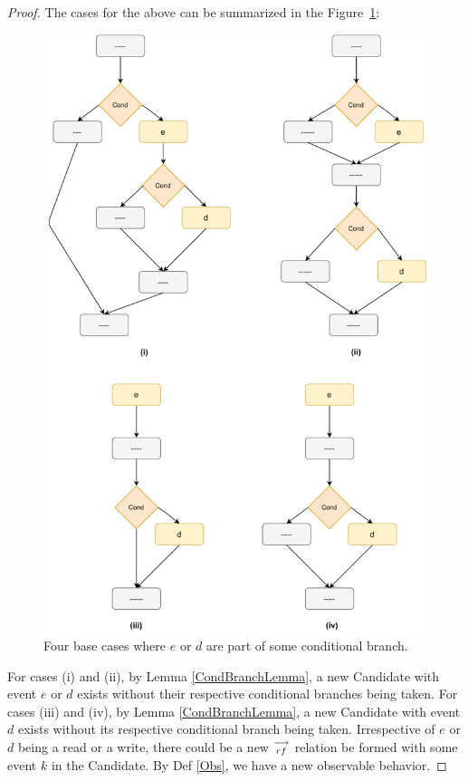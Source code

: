 \begin{proof}
            The cases for the above can be summarized in the Figure~\ref{reord:cond_branch_cases}: 
            \begin{figure}[H]
                \label{CondCases}
                \centering 
                \includegraphics[scale=0.5]{4.InstructionReordering/5.ValidReorderingProgram/ConditionalCases.pdf}
                \caption{Four base cases where $e$ or $d$ are part of some conditional branch.}
                \label{reord:cond_branch_cases}
            \end{figure}

            For cases (i) and (ii), by Lemma \ref{CondBranchLemma}, a new Candidate with event $e$ or $d$ exists without their respective conditional branches being taken.
            For cases (iii) and (iv), by Lemma \ref{CondBranchLemma}, a new Candidate with event $d$ exists without its respective conditional branch being taken.
            Irrespective of $e$ or $d$ being a read or a write, there could be a new $\stackrel{\longrightarrow}{_{rf}}$ relation be formed with some event $k$ in the Candidate. By Def \ref{Obs}, we have a new observable behavior\footnotemark. 


\end{proof}
